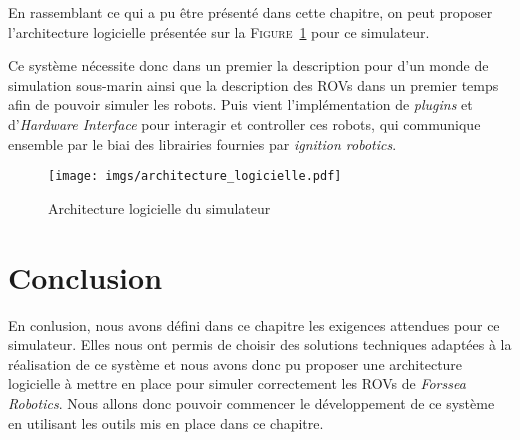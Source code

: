             En rassemblant ce qui a pu être présenté dans cette chapitre, on peut proposer l'architecture logicielle présentée sur la \textsc{Figure}~\ref{fig:architecture_logicielle} pour ce simulateur.
            
            Ce système nécessite donc dans un premier la description pour \gazebo{} d'un monde de simulation sous-marin ainsi que la description des \gls{ROV}s dans un premier temps afin de pouvoir simuler les robots. Puis vient l'implémentation de \textit{plugins} \gazebo{} et d'\textit{Hardware Interface} pour interagir et controller ces robots, qui communique ensemble par le biai des librairies fournies par \textit{ignition robotics}.
            
            \begin{figure}[!htb]
                \centering
                \texttt{[image: imgs/architecture\_logicielle.pdf]}
                \caption{Architecture logicielle du simulateur}
                \label{fig:architecture_logicielle}
            \end{figure}

    \section{Conclusion}

        En conlusion, nous avons défini dans ce chapitre les exigences attendues pour ce simulateur. Elles nous ont permis de choisir des solutions techniques adaptées à la réalisation de ce système et nous avons donc pu proposer une architecture logicielle à mettre en place pour simuler correctement les \gls{ROV}s de \textit{Forssea Robotics}. Nous allons donc pouvoir commencer le développement de ce système en utilisant les outils mis en place dans ce chapitre.
        